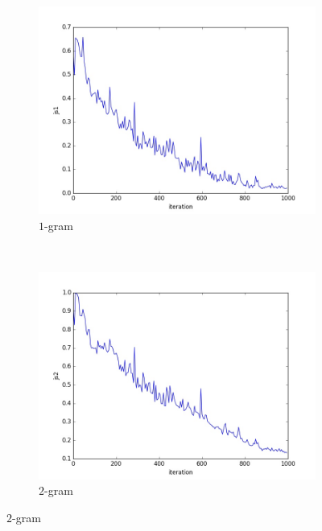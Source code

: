 \documentclass[10pt,a4paper]{article}
\begin{document}
\begin{figure}[H]
    \centering
    \begin{subfigure}[b]{0.4\textwidth}
        \includegraphics[width=\textwidth]{kanye/js1}
        \caption{$1$-gram}
    \end{subfigure}
    ~ 
    \begin{subfigure}[b]{0.4\textwidth}
        \includegraphics[width=\textwidth]{kanye/js2}
        \caption{$2$-gram}
    \end{subfigure}
    

\end{figure}
\end{document}
